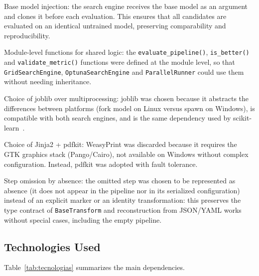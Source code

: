 \documentclass[conference]{IEEEtran}
\begin{document}
Base model injection: the search engine receives the base model as an argument
and clones it before each evaluation. This ensures that all candidates are
evaluated on an identical untrained model, preserving comparability and
reproducibility.

Module-level functions for shared logic: the \texttt{evaluate\_pipeline()},
\texttt{is\_better()} and \texttt{validate\_metric()} functions were defined at
the module level, so that \texttt{GridSearchEngine}, \texttt{OptunaSearchEngine}
and \texttt{ParallelRunner} could use them without needing inheritance.

Choice of joblib over multiprocessing: joblib was chosen because it abstracts
the differences between platforms (fork model on Linux versus spawn on
Windows), is compatible with both search engines, and is the same dependency
used by scikit-learn~\cite{pedregosa2011sklearn}.

Choice of Jinja2 + pdfkit: WeasyPrint was discarded because it requires the GTK
graphics stack (Pango/Cairo), not available on Windows without complex
configuration. Instead, pdfkit was adopted with fault tolerance.

Step omission by absence: the omitted step was chosen to be represented as
absence (it does not appear in the pipeline nor in its serialized
configuration) instead of an explicit marker or an identity transformation:
this preserves the type contract of \texttt{BaseTransform} and reconstruction
from JSON/YAML works without special cases, including the empty pipeline.

\subsection{Technologies Used}

Table~\ref{tab:tecnologias} summarizes the main dependencies.
\end{document}
